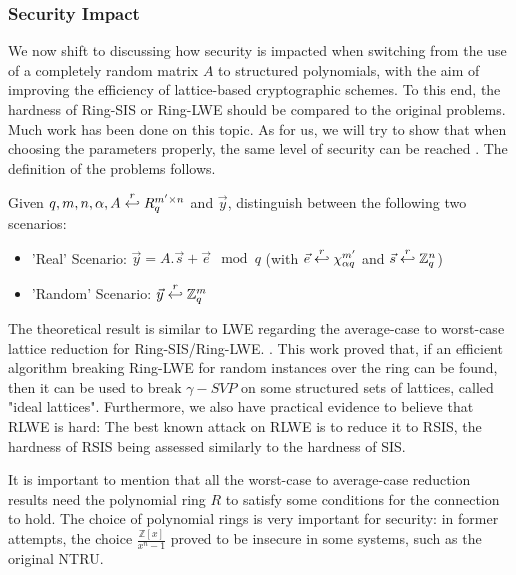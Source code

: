 \subsubsection{Security Impact}
\label{sec:securityImpact}
We now shift to discussing how security is impacted when switching from the use of a completely
random matrix $A$ to structured polynomials, with the aim of improving the efficiency of
lattice-based cryptographic schemes. To this end, the hardness of Ring-SIS
or Ring-LWE should be compared to the original problems. Much work has been done on
this topic. As for us, we will try to show that when choosing the parameters properly, the
same level of security can be reached . The definition of the problems follows.
\begin{definition}
   Given
  $q, m, n, \alpha, A \stackrel{r}{\hookleftarrow} {R}_q^{m' \times n}$ and $\vec{y}$,
  distinguish between the following two scenarios:
  \begin{itemize}
  \item 'Real' Scenario: $\vec{y} = A.\vec{s} + \vec{e} \mod q$ (with
    $\vec{e} \stackrel{r}{\hookleftarrow} \chi_{\alpha q}^{m'}$ and
    $\vec{s} \stackrel{r}{\hookleftarrow} \mathbb{Z}_q^n$)
  \item 'Random' Scenario: $\vec{y} \stackrel{r}{\hookleftarrow} \mathbb{Z}_q^m$
  \end{itemize}
\end{definition}
The theoretical result is similar  to LWE regarding the average-case to
worst-case lattice reduction for Ring-SIS/Ring-LWE.
\cite{lyubashevsky2010ideal}. This work proved that, if an efficient
algorithm breaking Ring-LWE for random instances over the ring can be found, then it can be used to break $\gamma-SVP$ on some structured sets of lattices, called "ideal
lattices". Furthermore, we also have practical evidence to believe that RLWE is
hard: The best known attack on RLWE is to reduce it to RSIS, the hardness of
RSIS being assessed similarly to the hardness of SIS.

It is important to mention that all the worst-case to average-case reduction
results need the polynomial ring $R$ to satisfy some conditions for the
connection to hold. The choice of polynomial rings is very important for
security: in former attempts, the choice $\frac{\mathbb{Z}[x]}{x^n - 1}$
proved to be insecure in some systems, such as the original NTRU.

